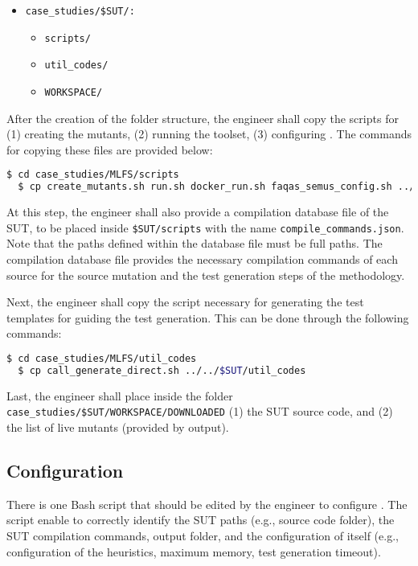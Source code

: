\begin{itemize}
	\item \texttt{case\_studies/\$SUT/:}
	\begin{itemize}
		\item \texttt{scripts/}
		\item \texttt{util\_codes/}
		\item \texttt{WORKSPACE/}
	\end{itemize}
\end{itemize}

After the creation of the folder structure, the engineer shall copy the scripts for (1) creating the mutants, (2) running the toolset, (3) configuring \SEMUS. The commands for copying these files are provided below:

\begin{lstlisting}[language=bash]
  $ cd case_studies/MLFS/scripts
  $ cp create_mutants.sh run.sh docker_run.sh faqas_semus_config.sh ../../$SUT/scripts
\end{lstlisting}

At this step, the engineer shall also provide a compilation database file of the SUT, to be placed inside \texttt{\$SUT/scripts} with the name \texttt{compile\_commands.json}. Note that the paths defined within the database file must be full paths. The compilation database file provides the necessary compilation commands of each source for the source mutation and the test generation steps of the methodology.

Next, the engineer shall copy the script necessary for generating the test templates for guiding the test generation. This can be done through the following commands:

\begin{lstlisting}[language=bash]
  $ cd case_studies/MLFS/util_codes
  $ cp call_generate_direct.sh ../../$SUT/util_codes
\end{lstlisting}

Last, the engineer shall place inside the folder \texttt{case\_studies/\$SUT/WORKSPACE/DOWNLOADED} (1) the SUT source code, and (2) the list of live mutants (provided by \MASS output).

\subsection{\SEMUS Configuration}

There is one Bash script that should be edited by the engineer to configure \SEMUS. The script enable \SEMUS to correctly identify the SUT paths (e.g., source code folder), the SUT compilation commands, output folder, and the configuration of \SEMUS itself (e.g., configuration of the heuristics, maximum memory, test generation timeout).

